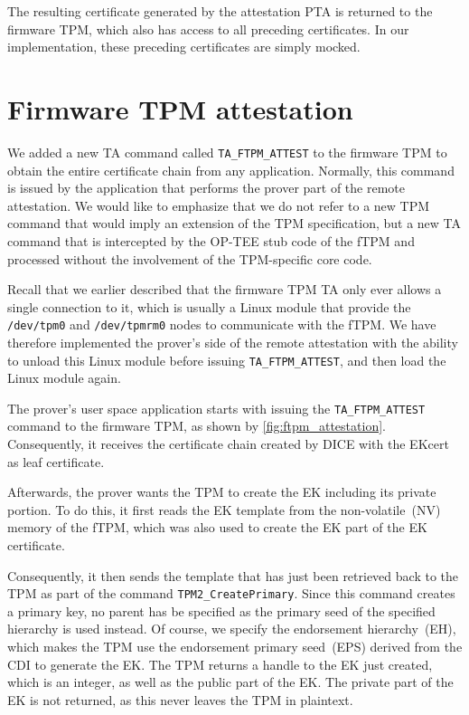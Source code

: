 The resulting certificate generated by the attestation PTA is returned to the firmware TPM, which also has access to all preceding certificates.
In our implementation, these preceding certificates are simply mocked.

\section{Firmware TPM attestation}\label{sec:impl_ftpm_attestation}



We added a new TA command called \texttt{TA\_FTPM\_ATTEST} to the firmware TPM to obtain the entire certificate chain from any application.
Normally, this command is issued by the application that performs the prover part of the remote attestation.
We would like to emphasize that we do not refer to a new TPM command that would imply an extension of the TPM specification, but a new TA command that is intercepted by the OP-TEE stub code of the fTPM and processed without the involvement of the TPM-specific core code.

Recall that we earlier described that the firmware TPM TA only ever allows a single connection to it, which is usually a Linux module that provide the \texttt{/dev/tpm0} and \texttt{/dev/tpmrm0} nodes to communicate with the fTPM\@.
We have therefore implemented the prover's side of the remote attestation with the ability to unload this Linux module before issuing \texttt{TA\_FTPM\_ATTEST}, and then load the Linux module again.

The prover's user space application starts with issuing the \texttt{TA\_FTPM\_ATTEST} command to the firmware TPM, as shown by \autoref{fig:ftpm_attestation}.
Consequently, it receives the certificate chain created by DICE with the EKcert as leaf certificate.

Afterwards, the prover wants the TPM to create the EK including its private portion.
To do this, it first reads the EK template from the non-volatile~(NV) memory of the fTPM, which was also used to create the EK part of the EK certificate.

Consequently, it then sends the template that has just been retrieved back to the TPM as part of the command \texttt{TPM2\_CreatePrimary}.
Since this command creates a primary key, no parent has be specified as the primary seed of the specified hierarchy is used instead.
Of course, we specify the endorsement hierarchy~(EH), which makes the TPM use the endorsement primary seed~(EPS) derived from the CDI to generate the EK\@.
The TPM returns a handle to the EK just created, which is an integer, as well as the public part of the EK\@.
The private part of the EK is not returned, as this never leaves the TPM in plaintext.

